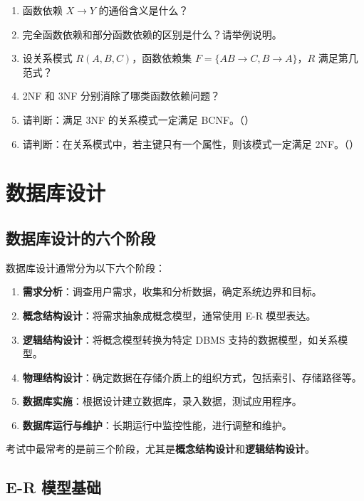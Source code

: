 \documentclass{../../note}
\begin{document}
\begin{enumerate}
  \item 函数依赖 $X \to Y$ 的通俗含义是什么？
  \item 完全函数依赖和部分函数依赖的区别是什么？请举例说明。
  \item 设关系模式 $R(A, B, C)$，函数依赖集 $F = \{AB \to C, B \to A\}$，$R$ 满足第几范式？
  \item 2NF 和 3NF 分别消除了哪类函数依赖问题？
  \item 请判断：满足 3NF 的关系模式一定满足 BCNF。（\hspace{1cm}）
  \item 请判断：在关系模式中，若主键只有一个属性，则该模式一定满足 2NF。（\hspace{1cm}）
\end{enumerate}

\section{数据库设计}

\subsection{数据库设计的六个阶段}

数据库设计通常分为以下六个阶段：

\begin{enumerate}
  \item \textbf{需求分析}：调查用户需求，收集和分析数据，确定系统边界和目标。
  \item \textbf{概念结构设计}：将需求抽象成概念模型，通常使用 E-R 模型表达。
  \item \textbf{逻辑结构设计}：将概念模型转换为特定 DBMS 支持的数据模型，如关系模型。
  \item \textbf{物理结构设计}：确定数据在存储介质上的组织方式，包括索引、存储路径等。
  \item \textbf{数据库实施}：根据设计建立数据库，录入数据，测试应用程序。
  \item \textbf{数据库运行与维护}：长期运行中监控性能，进行调整和维护。
\end{enumerate}

考试中最常考的是前三个阶段，尤其是\textbf{概念结构设计}和\textbf{逻辑结构设计}。

\subsection{E-R 模型基础}
\end{document}
